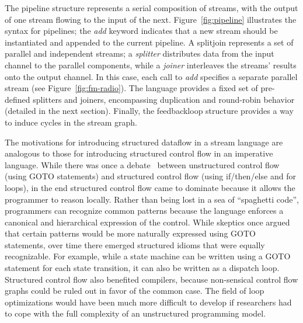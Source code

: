 The pipeline structure represents a serial composition of streams,
with the output of one stream flowing to the input of the next.
Figure~\ref{fig:pipeline} illustrates the syntax for pipelines; the
{\it add} keyword indicates that a new stream should be instantiated
and appended to the current pipeline.  A splitjoin represents a set of
parallel and independent streams; a {\it splitter} distributes data
from the input channel to the parallel components, while a {\it
joiner} interleaves the streams' results onto the output channel.  In
this case, each call to {\it add} specifies a separate parallel stream
(see Figure~\ref{fig:fm-radio}).  The language provides a fixed set of
pre-defined splitters and joiners, encompassing duplication and
round-robin behavior (detailed in the next section).  Finally, the
feedbackloop structure provides a way to induce cycles in the stream
graph.


The motivations for introducing structured dataflow in a stream
language are analogous to those for introducing structured control
flow in an imperative language.  While there was once a
debate~\cite{dijkstra_go_1968} between unstructured control flow
(using GOTO statements) and structured control flow (using
if/then/else and for loops), in the end structured control flow came
to dominate because it allows the programmer to reason locally.
Rather than being lost in a sea of ``spaghetti code'', programmers can
recognize common patterns because the language enforces a canonical
and hierarchical expression of the control.  While skeptics once
argued that certain patterns would be more naturally expressed using
GOTO statements, over time there emerged structured idioms that were
equally recognizable.  For example, while a state machine can be
written using a GOTO statement for each state transition, it can also
be written as a dispatch loop.  Structured control flow also benefited
compilers, because non-sensical control flow graphs could be ruled out
in favor of the common case.  The field of loop optimizations would
have been much more difficult to develop if researchers had to cope
with the full complexity of an unstructured programming model.

